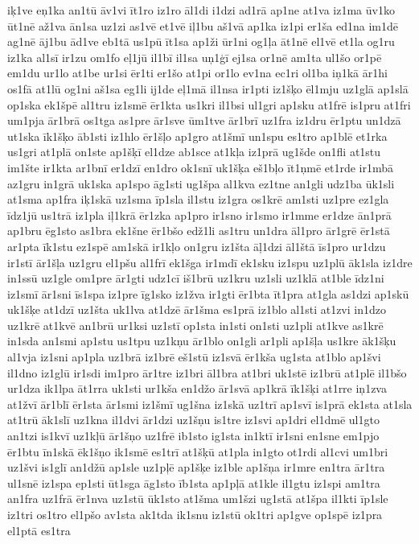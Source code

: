 {iķ1ve
eņ1ka
an1tū
āv1vi
īt1ro
iz1ro
āl1di
i1dzi
ad1rā
ap1ne
at1va
iz1ma
ūv1ko
ūt1nē
až1va
ān1sa
uz1zi
as1vē
et1vē
iļ1bu
aš1vā
ap1ka
iz1pi
er1ša
ed1na
im1dē
ag1nē
āj1bu
ād1ve
eb1tā
us1pū
īt1sa
ap1ži
ūr1ni
og1ļa
āt1nē
el1vē
et1la
og1ru
iz1ka
al1sī
ir1zu
om1fo
eļ1jū
il1bī
il1sa
uņ1ģī
ej1sa
or1nē
am1ta
ul1šo
or1pē
em1du
ur1lo
at1be
ur1si
ēr1ti
er1šo
at1pi
or1lo
ev1na
ec1ri
ol1ba
iņ1kā
ār1hi
os1fā
at1lū
og1ni
aš1sa
eg1li
ij1de
eļ1mā
il1nsa
ir1pti
iz1šķo
ēl1mju
uz1glā
ap1slā
op1ska
ek1špē
al1tru
iz1smē
ēr1kta
us1kri
il1bsi
ul1gri
ap1sku
at1frē
is1pru
at1fri
um1pja
ār1brā
os1tga
as1pre
ār1sve
ūm1tve
ār1brī
uz1fra
iz1dru
ēr1ptu
un1dzā
ut1ska
īk1šķo
āb1sti
iz1hlo
ēr1šļo
ap1gro
at1šmī
un1spu
es1tro
ap1blē
et1rka
us1gri
at1plā
on1ste
ap1šķī
el1dze
ab1sce
at1kļa
iz1prā
ug1šde
on1fli
at1stu
im1šte
ir1kta
ar1bnī
er1dzī
en1dro
ok1snī
uk1šķa
eš1bļo
īt1ņmē
et1rde
ir1mbā
az1gru
in1grā
uk1ska
ap1spo
āg1sti
ug1špa
al1kva
ez1tne
an1gli
udz1ba
ūk1sli
at1sma
ap1fra
iķ1skā
uz1sma
īp1sla
il1stu
iz1gra
os1krē
am1sti
uz1pre
ez1gla
īdz1jū
us1trā
iz1pla
iļ1krā
ēr1zka
ap1pro
ir1sno
ir1smo
ir1mme
er1dze
ān1prā
ap1bru
ēg1sto
as1bra
ek1šne
ēr1bšo
edž1li
as1tru
un1dra
āl1pro
ār1grē
ēr1stā
ar1pta
īk1stu
ez1spē
am1skā
ir1kļo
on1gru
iz1šta
āļ1dzi
āl1štā
īs1pro
ur1dzu
ir1stī
ār1šļa
uz1gru
el1pšu
al1frī
ek1šga
ir1mdī
ek1sku
iz1spu
uz1plū
āk1sla
iz1dre
in1ssū
uz1gle
om1pre
ār1gti
udz1cī
iš1brū
uz1kru
uz1sli
uz1klā
at1ble
īdz1ni
iz1smī
ār1sni
īs1spa
iz1pre
īg1sko
iz1žva
ir1gti
ēr1bta
īt1pra
at1gla
as1dzi
ap1skū
uk1šķe
at1dzī
uz1šta
uk1lva
at1dzē
ār1šma
es1prā
iz1blo
al1sti
at1zvi
in1dzo
uz1krē
at1kvē
an1brū
ur1ksi
uz1stī
op1sta
in1sti
on1sti
uz1pli
at1kve
as1krē
in1sda
an1smi
ap1stu
us1tpu
uz1kņu
ār1blo
on1gli
ar1pli
ap1šļa
us1kre
āk1šķu
al1vja
iz1sni
ap1pla
uz1brā
iz1brē
eš1stū
iz1svā
ēr1kša
ug1sta
at1blo
ap1švi
il1dno
iz1glū
ir1sdi
im1pro
ār1tre
iz1bri
āl1bra
at1bri
uk1stē
iz1brū
at1plē
il1bšo
ur1dza
ik1lpa
āt1rra
uk1sti
ur1kša
en1džo
ār1svā
ap1krā
īk1šķi
at1rre
iņ1zva
at1žvī
ār1blī
ēr1sta
ār1smi
iz1šmī
ug1šna
iz1skā
uz1trī
ap1svī
is1prā
ek1sta
at1sla
at1trū
āk1slī
uz1kna
il1dvi
ār1dzi
uz1šņu
is1tre
iz1svi
ap1dri
el1dmē
ul1gto
an1tzi
is1kvī
uz1kļū
ār1šņo
uz1frē
ib1sto
ig1sta
in1ktī
ir1sni
en1sne
em1pjo
ēr1btu
īn1skā
ēk1šņo
ik1smē
es1trī
at1šķū
at1pla
in1gto
ot1rdi
al1cvi
um1bri
uz1švi
is1glī
an1džū
ap1sle
uz1pļē
ap1šķe
iz1ble
ap1šņa
ir1mre
en1tra
ār1tra
ul1snē
iz1spa
ep1sti
ūt1sga
āg1sto
īb1sta
ap1pļā
at1kle
il1gtu
iz1spi
am1tra
an1fra
uz1frā
ēr1nva
uz1stū
ūk1sto
at1šma
um1šzi
ug1stā
at1špa
il1kti
īp1sle
iz1tri
os1tro
el1pšo
av1sta
ak1tda
ik1snu
iz1stū
ok1tri
ap1gve
op1spē
iz1pra
el1ptā
es1tra
}

